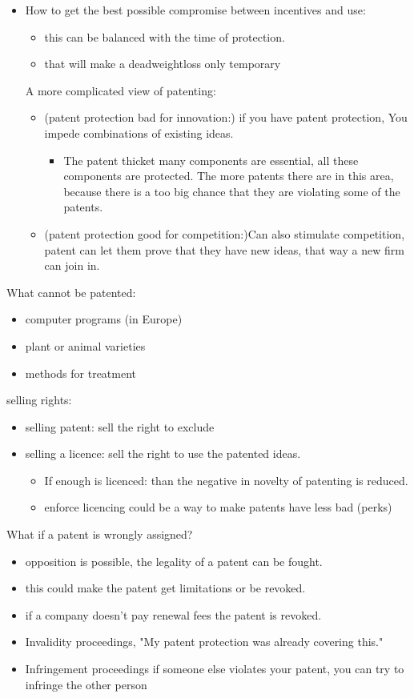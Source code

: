 \documentclass[12pt, a4paper, titlepage]{extarticle}
\begin{document}
\begin{itemize}
    \item How to get the best possible compromise between incentives and use:
    \begin{itemize}
        \item this can be balanced with the time of protection.
        \item that will make a deadweightloss only temporary
    \end{itemize}
    A more complicated view of patenting:
    \begin{itemize}
        \item (patent protection bad for innovation:) if you have patent protection, You impede combinations of existing ideas.
        \begin{itemize}
            \item The patent thicket many components are essential, all these components are protected. The more patents there are in this area, because there is a too big chance that they are violating some of the patents.
        \end{itemize}
        \item (patent protection good for competition:)Can also stimulate competition, patent can let them prove that they have new ideas, that way a new firm can join in.
    \end{itemize}
\end{itemize}
What cannot be patented:
\begin{itemize}
    \item computer programs (in Europe)
    \item plant or animal varieties
    \item methods for treatment
\end{itemize}
selling rights:
\begin{itemize}
    \item selling patent: sell the right to exclude
    \item selling a licence: sell the right to use the patented ideas.
    \begin{itemize}
        \item If enough is licenced: than the negative in novelty of patenting is reduced.
        \item enforce licencing could be a way to make patents have less bad (perks)
    \end{itemize}
\end{itemize}
What if a patent is wrongly assigned?
\begin{itemize}
    \item opposition is possible, the legality of a patent can be fought.
    \item this could make the patent get limitations or be revoked.
    \item if a company doesn't pay renewal fees the patent is revoked.
    \item Invalidity proceedings, "My patent protection was already covering this."
    \item Infringement proceedings if someone else violates your patent, you can try to infringe the other person
\end{itemize}
\end{document}
